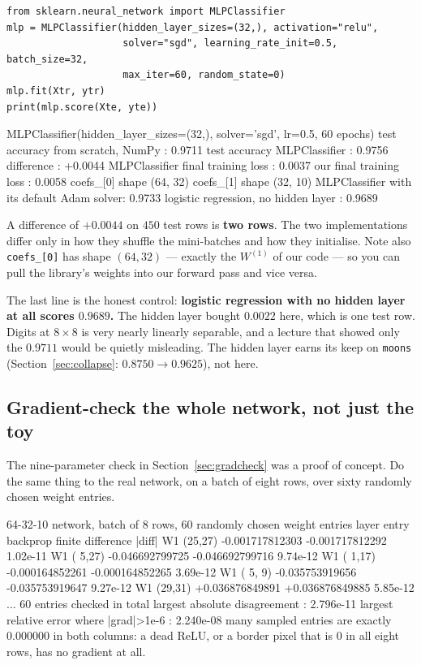\documentclass[11pt]{article}
\begin{document}
\begin{lstlisting}
from sklearn.neural_network import MLPClassifier
mlp = MLPClassifier(hidden_layer_sizes=(32,), activation="relu",
                    solver="sgd", learning_rate_init=0.5, batch_size=32,
                    max_iter=60, random_state=0)
mlp.fit(Xtr, ytr)
print(mlp.score(Xte, yte))
\end{lstlisting}
\begin{codeout}
MLPClassifier(hidden_layer_sizes=(32,), solver='sgd', lr=0.5, 60 epochs)
   test accuracy from scratch, NumPy : 0.9711
   test accuracy MLPClassifier       : 0.9756
   difference                        : +0.0044
   MLPClassifier final training loss : 0.0037
   our      final training loss      : 0.0058
   coefs_[0] shape (64, 32)  coefs_[1] shape (32, 10)
   MLPClassifier with its default Adam solver: 0.9733
   logistic regression, no hidden layer      : 0.9689
\end{codeout}

A difference of $+0.0044$ on $450$ test rows is \textbf{two rows}. The two
implementations differ only in how they shuffle the mini-batches and how they
initialise. Note also \texttt{coefs\_[0]} has shape $(64, 32)$ --- exactly the
$W^{(1)}$ of our code --- so you can pull the library's weights into our
forward pass and vice versa.

The last line is the honest control: \textbf{logistic regression with no
hidden layer at all scores $0.9689$.} The hidden layer bought $0.0022$ here,
which is one test row. Digits at $8\times8$ is very nearly linearly separable,
and a lecture that showed only the $0.9711$ would be quietly misleading. The
hidden layer earns its keep on \texttt{moons} (Section~\ref{sec:collapse}:
$0.8750 \to 0.9625$), not here.

\subsection{Gradient-check the whole network, not just the toy}

The nine-parameter check in Section~\ref{sec:gradcheck} was a proof of
concept. Do the same thing to the real network, on a batch of eight rows, over
sixty randomly chosen weight entries.

\begin{codeout}
64-32-10 network, batch of 8 rows, 60 randomly chosen weight entries
layer  entry        backprop            finite difference     |diff|
  W1   (25,27)   -0.001717812303     -0.001717812292     1.02e-11
  W1   ( 5,27)   -0.046692799725     -0.046692799716     9.74e-12
  W1   ( 1,17)   -0.000164852261     -0.000164852265     3.69e-12
  W1   ( 5, 9)   -0.035753919656     -0.035753919647     9.27e-12
  W1   (29,31)   +0.036876849891     +0.036876849885     5.85e-12
  ... 60 entries checked in total
largest absolute disagreement            : 2.796e-11
largest relative error where |grad|>1e-6 : 2.240e-08
many sampled entries are exactly 0.000000 in both columns: a dead ReLU,
or a border pixel that is 0 in all eight rows, has no gradient at all.
\end{codeout}
\end{document}
